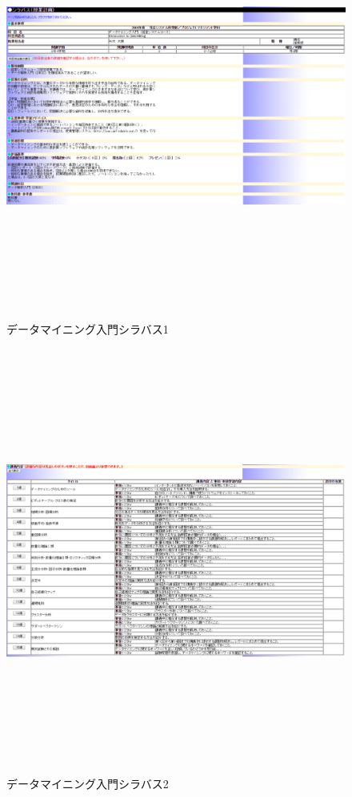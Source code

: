 \begin{figure}[htb]
\centering
\includegraphics[height=14cm,width=13cm]{sirabasu1.pdf}
\caption{データマイニング入門シラバス1}\label{サンプル図}
\end{figure}

\begin{figure}[htb]
\centering
\includegraphics[height=14cm,width=13cm]{sirabasu.pdf}
\caption{データマイニング入門シラバス2}\label{サンプル図}
\end{figure}

